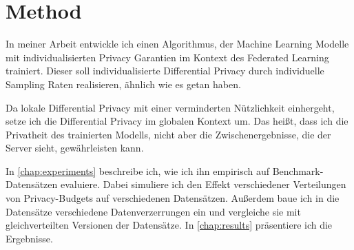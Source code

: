 \chapter{Method}\label{chap:methods}

	

In meiner Arbeit entwickle ich einen Algorithmus, der Machine Learning Modelle mit individualisierten Privacy Garantien im Kontext des Federated Learning trainiert. Dieser soll individualisierte Differential Privacy durch individuelle Sampling Raten realisieren, ähnlich wie es \textcite{jorgensen:2015, boenisch:2023} getan haben.

Da lokale Differential Privacy mit einer verminderten Nützlichkeit einhergeht, setze ich die Differential Privacy im globalen Kontext um. Das heißt, dass ich die Privatheit des trainierten Modells, nicht aber die Zwischenergebnisse, die der Server sieht, gewährleisten kann.

In \autoref{chap:experiments} beschreibe ich, wie ich ihn empirisch auf Benchmark-Datensätzen evaluiere. Dabei simuliere ich den Effekt verschiedener Verteilungen von Privacy-Budgets auf verschiedenen Datensätzen. Außerdem baue ich in die Datensätze verschiedene Datenverzerrungen ein und vergleiche sie mit gleichverteilten Versionen der Datensätze. In \autoref{chap:results} präsentiere ich die Ergebnisse.

